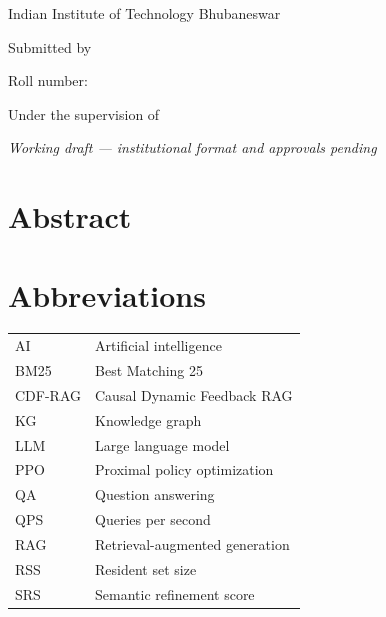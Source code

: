 \documentclass[12pt,a4paper,oneside,openany]{report}
\begin{document}
\begin{titlepage}
\centering
{\Large Indian Institute of Technology Bhubaneswar\par}
\vspace{1.7cm}
{\LARGE\bfseries \ThesisTitle\par}
\vspace{1.6cm}
{\large \DocumentPurpose\par}
\vspace{1cm}
{\large Submitted by\par}
\vspace{0.3cm}
{\Large\bfseries \StudentName\par}
{\large Roll number: \RollNumber\par}
\vspace{1cm}
{\large Under the supervision of\par}
{\Large \SupervisorName\par}
\vfill
{\large \SchoolName\par}
{\large \ProgrammeName\par}
{\large \SubmissionDate\par}
\vspace{0.6cm}
{\small\itshape Working draft --- institutional format and approvals pending\par}
\end{titlepage}

\chapter*{Abstract}

\clearpage
\tableofcontents
\clearpage
\listoffigures
\clearpage
\listoftables
\clearpage
\chapter*{Abbreviations}
\begin{tabular}{@{}ll@{}}
AI & Artificial intelligence\\
BM25 & Best Matching 25\\
CDF-RAG & Causal Dynamic Feedback RAG\\
KG & Knowledge graph\\
LLM & Large language model\\
PPO & Proximal policy optimization\\
QA & Question answering\\
QPS & Queries per second\\
RAG & Retrieval-augmented generation\\
RSS & Resident set size\\
SRS & Semantic refinement score\\
\end{tabular}
\clearpage
{}






\appendix




\end{document}
